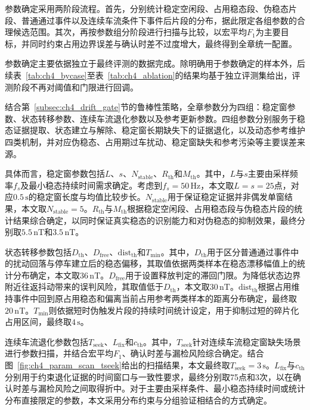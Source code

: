 \documentclass{xdupgthesis}
\begin{document}
参数确定采用两阶段流程。首先，分别统计稳定空闲段、占用稳态段、伪稳态片段、普通通过事件以及连续车流条件下事件后片段的分布，据此限定各组参数的合理候选范围。其次，再按参数组分阶段进行扫描与比较，以宏平均$F_1$为主要目标，并同时约束占用边界误差与确认时差不过度增大，最终得到全章统一配置。

参数确定主要依据独立于最终评测的数据完成。除明确用于参数确定的样本外，后续表~\ref{tab:ch4_bycase}至表~\ref{tab:ch4_ablation}的结果均基于独立评测集给出，评测阶段不再对阈值和门限进行回调。

结合第~\ref{subsec:ch4_drift_gate}节的鲁棒性策略，全章参数分为四组：稳定窗参数、状态转移参数、连续车流退化参数以及参考更新参数。四组参数分别服务于稳态证据提取、状态建立与解除、稳定窗长期缺失下的证据退化，以及动态参考维护四类机制，并对应伪稳态、占用期过车扰动、稳定窗缺失和参考污染等主要误差来源。

具体而言，稳定窗参数包括$L$、$s$、$N_{\mathrm{stable}}$、$R_{\mathrm{th}}$和$M_{\mathrm{th}}$。其中，$L$与$s$主要由采样频率$f_s$及最小稳态持续时间需求确定。考虑到$f_s=50\,\mathrm{Hz}$，本文取$L=s=25$点，对应$0.5\,\mathrm{s}$的稳定窗长度与均值比较步长。$N_{\mathrm{stable}}$用于保证稳定证据并非偶发单窗结果，本文取$N_{\mathrm{stable}}=5$。$R_{\mathrm{th}}$与$M_{\mathrm{th}}$根据稳定空闲段、占用稳态段与伪稳态片段的统计结果综合确定，以同时保证真实稳态的识别能力和对伪稳态的抑制效果，最终分别取$5.5\,\mathrm{nT}$和$3.5\,\mathrm{nT}$。

状态转移参数包括$D_{\mathrm{th}}$、$D_{\mathrm{free}}$、$\mathrm{dist}_{\mathrm{th}}$和$T_{\min}$。其中，$D_{\mathrm{th}}$用于区分普通通过事件中的扰动回落与停车建立后的稳态偏移，其取值依据两类样本在稳态漂移幅值上的统计分布确定，本文取$36\,\mathrm{nT}$。$D_{\mathrm{free}}$用于设置释放判定的滞回门限。为降低状态边界附近往返抖动带来的误判风险，其取值低于$D_{\mathrm{th}}$，本文取$30\,\mathrm{nT}$。$\mathrm{dist}_{\mathrm{th}}$根据占用维持事件中回到原占用稳态和偏离当前占用参考两类样本的距离分布确定，最终取$20\,\mathrm{nT}$。$T_{\min}$则依据短时伪触发片段的持续时间统计设定，用于抑制过短的碎片化占用区间，最终取$4\,\mathrm{s}$。

连续车流退化参数包括$T_{\mathrm{seek}}$、$L_{\mathrm{fix}}$和$c_{\mathrm{th}}$。其中，$T_{\mathrm{seek}}$针对连续车流稳定窗缺失场景进行参数扫描，并结合宏平均$F_1$、确认时差与漏检风险综合确定。结合图~\ref{fig:ch4_param_scan_tseek}给出的扫描结果，本文最终取$T_{\mathrm{seek}}=3\,\mathrm{s}$。$L_{\mathrm{fix}}$与$c_{\mathrm{th}}$分别用于约束退化证据的时间窗口与一致性要求，最终分别取75点和3次，以在确认时差与漏检风险之间取得折中。对于主要由采样条件、最小稳态持续时间或统计分布直接限定的参数，本文采用分布约束与分组验证相结合的方式确定。
\end{document}
